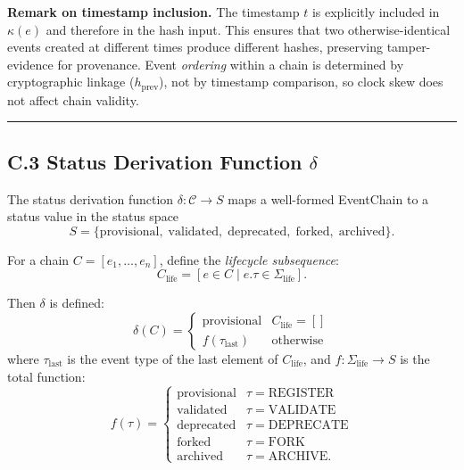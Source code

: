 \textbf{Remark on timestamp inclusion.} The timestamp $t$ is explicitly included in $\kappa(e)$ and therefore in the hash input. This ensures that two otherwise-identical events created at different times produce different hashes, preserving tamper-evidence for provenance. Event \emph{ordering} within a chain is determined by cryptographic linkage ($h_{\text{prev}}$), not by timestamp comparison, so clock skew does not affect chain validity.

\begin{center}\rule{0.5\linewidth}{0.5pt}\end{center}


\subsection{C.3 Status Derivation Function $\delta$}\label{c.3-status-derivation-function-delta}

The status derivation function $\delta : \mathcal{C} \to S$ maps a well-formed EventChain to a status value in the status space
\[
S = \{\text{provisional},\; \text{validated},\; \text{deprecated},\; \text{forked},\; \text{archived}\}.
\]

For a chain $C = [e_1, \ldots, e_n]$, define the \emph{lifecycle subsequence}:
\[
C_{\text{life}} = [e \in C \mid e.\tau \in \Sigma_{\text{life}}].
\]

Then $\delta$ is defined:
\begin{equation}
\delta(C) =
  \begin{cases}
  \text{provisional} & C_{\text{life}} = [] \\
  f(\tau_{\text{last}}) & \text{otherwise}
  \end{cases}
\end{equation}
where $\tau_{\text{last}}$ is the event type of the last element of $C_{\text{life}}$, and $f : \Sigma_{\text{life}} \to S$ is the total function:
\begin{equation}
f(\tau) =
  \begin{cases}
  \text{provisional} & \tau = \text{REGISTER} \\
  \text{validated} & \tau = \text{VALIDATE} \\
  \text{deprecated} & \tau = \text{DEPRECATE} \\
  \text{forked} & \tau = \text{FORK} \\
  \text{archived} & \tau = \text{ARCHIVE}.
  \end{cases}
\end{equation}


